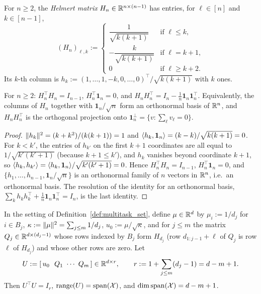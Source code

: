 \begin{definition}\label{def:helmert}
For $n \ge 2$, the \emph{Helmert matrix} $H_n \in \mathbb{R}^{n\times(n-1)}$ has entries, for
$\ell \in [n]$ and $k \in [n-1]$,
\[
  (H_n)_{\ell,k} :=
  \begin{cases}
    \dfrac{1}{\sqrt{k(k+1)}} & \text{if } \ell \le k,\\[8pt]
    -\dfrac{k}{\sqrt{k(k+1)}} & \text{if } \ell = k+1,\\[8pt]
    0 & \text{if } \ell \ge k+2 .
  \end{cases}
\]
Its $k$-th column is $h_k := (1,\dots,1,-k,0,\dots,0)^\top/\sqrt{k(k+1)}$ with $k$ ones.
\end{definition}

\begin{lemma}\label{lem:helmert_props}
For $n\ge 2$: $H_n^\top H_n = I_{n-1}$, $H_n^\top\mathbf 1_n = 0$, and
$H_nH_n^\top = I_n - \frac1n\mathbf 1_n\mathbf 1_n^\top$. Equivalently, the columns of $H_n$
together with $\mathbf 1_n/\sqrt n$ form an orthonormal basis of $\mathbb{R}^n$, and $H_nH_n^\top$ is
the orthogonal projection onto $\mathbf 1_n^\perp = \{v : \sum_\ell v_\ell = 0\}$.
\end{lemma}

\begin{proof}
$\lVert h_k \rVert^2 = (k + k^2)/(k(k+1)) = 1$ and $\langle h_k, \mathbf 1_n \rangle = (k - k)/\sqrt{k(k+1)} = 0$.
For $k < k'$, the entries of $h_{k'}$ on the first $k+1$ coordinates are all equal to
$1/\sqrt{k'(k'+1)}$ (because $k+1 \le k'$), and $h_k$ vanishes beyond coordinate $k+1$, so
$\langle h_k, h_{k'} \rangle = \langle h_k, \mathbf 1_n \rangle/\sqrt{k'(k'+1)} = 0$. Hence $H_n^\top H_n = I_{n-1}$,
$H_n^\top\mathbf 1_n = 0$, and $\{h_1,\dots,h_{n-1},\mathbf 1_n/\sqrt n\}$ is an orthonormal
family of $n$ vectors in $\mathbb{R}^n$, i.e.\ an orthonormal basis. The resolution of the identity
for an orthonormal basis, $\sum_k h_kh_k^\top + \frac1n\mathbf 1_n\mathbf 1_n^\top = I_n$,
is the last identity.
\end{proof}

\begin{lemma}\label{lem:multitask_basis}
\leanok
{}
In the setting of Definition~\ref{def:multitask_set}, define $\mu \in \mathbb{R}^d$ by
$\mu_i := 1/d_j$ for $i \in B_j$, $\kappa := \lVert \mu \rVert^2 = \sum_{j\le m}1/d_j$,
$u_0 := \mu/\sqrt\kappa$, and for $j \le m$ the matrix $Q_j \in \mathbb{R}^{d\times(d_j-1)}$ whose
rows indexed by $B_j$ form $H_{d_j}$ (row $d_{1:j-1}+\ell$ of $Q_j$ is row $\ell$ of
$H_{d_j}$) and whose other rows are zero. Let
\[
  U := [\,u_0\ \ Q_1\ \cdots\ Q_m\,] \in \mathbb{R}^{d\times r}, \qquad r := 1 + \sum_{j\le m}(d_j - 1) = d - m + 1 .
\]
Then $U^\top U = I_r$, $\mathrm{range}(U) = \operatorname{span}(\mathcal{X})$, and $\dim\operatorname{span}(\mathcal{X}) = d - m + 1$.
\end{lemma}

